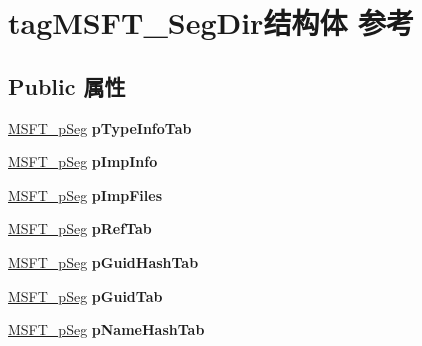 \hypertarget{structtag_m_s_f_t___seg_dir}{}\section{tag\+M\+S\+F\+T\+\_\+\+Seg\+Dir结构体 参考}
\label{structtag_m_s_f_t___seg_dir}
\subsection*{Public 属性}
\begin{DoxyCompactItemize}
\item 
\mbox{\label{structtag_m_s_f_t___seg_dir_ab3b0e883b305d528ff32623763d15bb6}} 
\hyperlink{structtag_m_s_f_t__p_seg}{M\+S\+F\+T\+\_\+p\+Seg} {\bfseries p\+Type\+Info\+Tab}
\item 
\mbox{\label{structtag_m_s_f_t___seg_dir_a171717bf023082734f224734db6b1636}} 
\hyperlink{structtag_m_s_f_t__p_seg}{M\+S\+F\+T\+\_\+p\+Seg} {\bfseries p\+Imp\+Info}
\item 
\mbox{\label{structtag_m_s_f_t___seg_dir_a9f9cd9d73fa64816742ac8c13866c6bf}} 
\hyperlink{structtag_m_s_f_t__p_seg}{M\+S\+F\+T\+\_\+p\+Seg} {\bfseries p\+Imp\+Files}
\item 
\mbox{\label{structtag_m_s_f_t___seg_dir_ab2c192bc6b1015a716140a2b22ffa1fc}} 
\hyperlink{structtag_m_s_f_t__p_seg}{M\+S\+F\+T\+\_\+p\+Seg} {\bfseries p\+Ref\+Tab}
\item 
\mbox{\label{structtag_m_s_f_t___seg_dir_a15087cc219d1c19e7f08bdf778e320af}} 
\hyperlink{structtag_m_s_f_t__p_seg}{M\+S\+F\+T\+\_\+p\+Seg} {\bfseries p\+Guid\+Hash\+Tab}
\item 
\mbox{\label{structtag_m_s_f_t___seg_dir_aa08376a447cf4690ab3975fba531b0df}} 
\hyperlink{structtag_m_s_f_t__p_seg}{M\+S\+F\+T\+\_\+p\+Seg} {\bfseries p\+Guid\+Tab}
\item 
\mbox{\label{structtag_m_s_f_t___seg_dir_a11c167d8a042e51ac1ed352753b9c62a}} 
\hyperlink{structtag_m_s_f_t__p_seg}{M\+S\+F\+T\+\_\+p\+Seg} {\bfseries p\+Name\+Hash\+Tab}

\end{DoxyCompactItemize}
